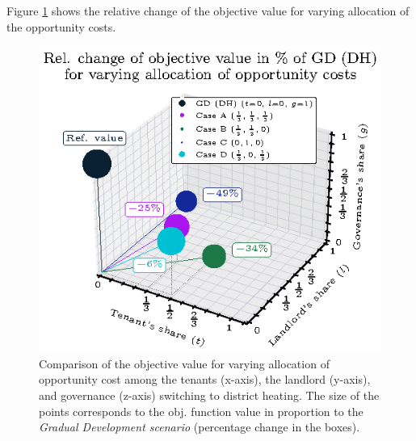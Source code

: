 \begin{table}[h]
	\centering
	\caption{Allocation of the opportunity costs (costs of inaction) among the governance, the landlord, and tenants}
	\label{tab:allocation}
\end{table}

Figure \ref{fig:3dplot} shows the relative change of the objective value for varying allocation of the opportunity costs. 

\begin{figure}[h]
	\centering
	\includegraphics[width=0.65\linewidth]{figures/4_Results/fig_3d_plot/3d.eps}
	\caption{Comparison of the objective value for varying allocation of opportunity cost among the tenants (x-axis), the landlord (y-axis), and governance (z-axis) switching to district heating. The size of the points corresponds to the obj. function value in proportion to the \textit{Gradual Development scenario} (percentage change in the boxes).}
	\label{fig:3dplot}
\end{figure}

